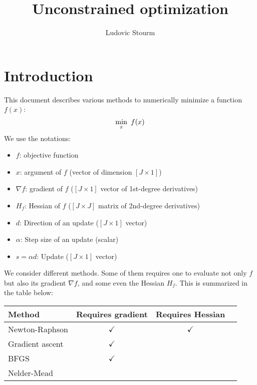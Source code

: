 \documentclass[12pt]{article}
\title{Unconstrained optimization}
\author{Ludovic Stourm}
\begin{document}
\maketitle

\section{Introduction}
This document describes various methods to numerically minimize a function $f(x)$:
\begin{equation}
	\underset{x}{\min} \hspace*{5pt} f(x)
\end{equation}
We use the notations:
\begin{itemize}
	\item $f$: objective function
	\item $x$: argument of $f$ (vector of dimension $[J \times 1]$)
	\item $\nabla f$: gradient of $f$ ($[J \times 1]$ vector of 1st-degree derivatives)
	\item $H_f$: Hessian of $f$ ($[J \times J]$ matrix of 2nd-degree derivatives)
	\item $d$: Direction of an update ($[J \times 1]$ vector)
	\item $\alpha$: Step size of an update (scalar)
	\item $s = \alpha d$: Update ($[J \times 1]$ vector)
\end{itemize}
\vspace*{15pt}
We consider different methods. Some of them requires one to evaluate not only $f$ but also its gradient $\nabla f$, and some even the Hessian $H_f$. This is summarized in the table below:
\begin{center}
\begin{tabular}{|l|c|c|c}
	\hline
	Method & Requires gradient & Requires Hessian  \\ \hline
	Newton-Raphson		& $\checkmark$  & $\checkmark$   \\
	Gradient ascent		& $\checkmark$  &  \\
	BFGS				& $\checkmark$  &  \\
	Nelder-Mead			&   &  \\
	\hline
\end{tabular}
\end{center}
\end{document}

